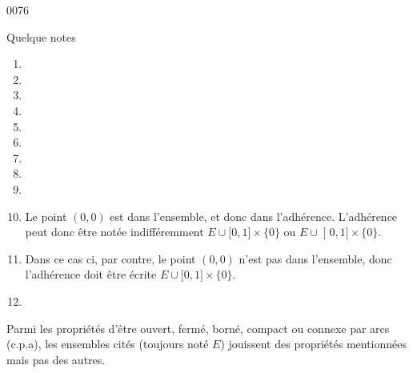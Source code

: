 
\begin{corrige}{0076}

Quelque notes
\begin{enumerate}
\item 
\item 
\item 
\item 
\item 
\item 
\item 
\item 
\item 
\item 
Le point $(0,0)$ est dans l'ensemble, et donc dans l'adhérence. L'adhérence peut donc être notée indifféremment $E \cup \mathopen[0,1\mathclose]\times\{0\}$ ou $E \cup \mathopen]0,1\mathclose]\times\{0\}$.

\item 
Dans ce cas ci, par contre, le point $(0,0)$ n'est pas dans l'ensemble, donc l'adhérence doit être écrite $E \cup \mathopen[0,1\mathclose]\times\{0\}$.
\item 
\end{enumerate}

Parmi les propriétés d'être ouvert, fermé, borné, compact ou connexe par arcs (c.p.a), les ensembles cités (toujours noté $E$) jouissent des propriétés mentionnées mais pas des autres.


\end{corrige}
